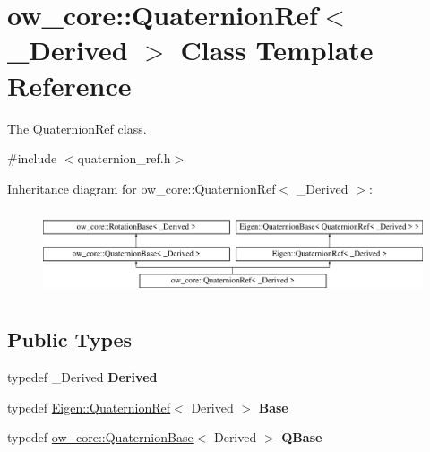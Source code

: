 \hypertarget{classow__core_1_1QuaternionRef}{}\section{ow\+\_\+core\+:\+:Quaternion\+Ref$<$ \+\_\+\+Derived $>$ Class Template Reference}
\label{classow__core_1_1QuaternionRef}


The \hyperlink{classow__core_1_1QuaternionRef}{Quaternion\+Ref} class.  




{\ttfamily \#include $<$quaternion\+\_\+ref.\+h$>$}

Inheritance diagram for ow\+\_\+core\+:\+:Quaternion\+Ref$<$ \+\_\+\+Derived $>$\+:\begin{figure}[H]
\begin{center}
\leavevmode
\includegraphics[height=2.537765cm]{d8/dae/classow__core_1_1QuaternionRef}
\end{center}
\end{figure}
\subsection*{Public Types}
\begin{DoxyCompactItemize}
\item 
typedef \+\_\+\+Derived {\bfseries Derived}\hypertarget{classow__core_1_1QuaternionRef_a0a3fe2b7030b00914878ab4ad65faa1d}{}\label{classow__core_1_1QuaternionRef_a0a3fe2b7030b00914878ab4ad65faa1d}

\item 
typedef \hyperlink{classEigen_1_1QuaternionRef}{Eigen\+::\+Quaternion\+Ref}$<$ Derived $>$ {\bfseries Base}\hypertarget{classow__core_1_1QuaternionRef_a3beee92d95baf28e734df3ef3a795fb5}{}\label{classow__core_1_1QuaternionRef_a3beee92d95baf28e734df3ef3a795fb5}

\item 
typedef \hyperlink{classow__core_1_1QuaternionBase}{ow\+\_\+core\+::\+Quaternion\+Base}$<$ Derived $>$ {\bfseries Q\+Base}\hypertarget{classow__core_1_1QuaternionRef_a8db98a71981b8c27c3ebdfc8a535e39b}{}\label{classow__core_1_1QuaternionRef_a8db98a71981b8c27c3ebdfc8a535e39b}

\end{DoxyCompactItemize}
